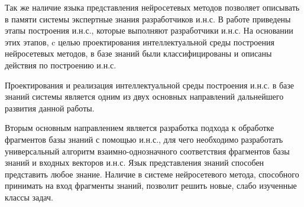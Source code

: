 Так же наличие языка представления нейросетевых методов позволяет описывать в памяти системы экспертные знания разработчиков и.н.с. В работе приведены этапы построения и.н.с., которые выполняют разработчики и.н.с. На основании этих этапов, c целью проектирования интеллектуальной среды построения нейросетевых методов, в базе знаний были классифицированы и описаны действия по построению и.н.с.

Проектирования и реализация интеллектуальной среды построения и.н.с. в базе знаний системы является одним из двух основных направлений дальнейшего развития данной работы.

Вторым основным направлением является разработка подхода к обработке фрагментов базы знаний с помощью и.н.с., для чего необходимо разработать универсальный алгоритм взаимно-однозначного соответствия фрагментов базы знаний и входных векторов и.н.с. Язык представления знаний способен представить любое знание. Наличие в системе нейросетевого метода, способного принимать на вход фрагменты знаний, позволит решить новые, слабо изученные классы задач. 